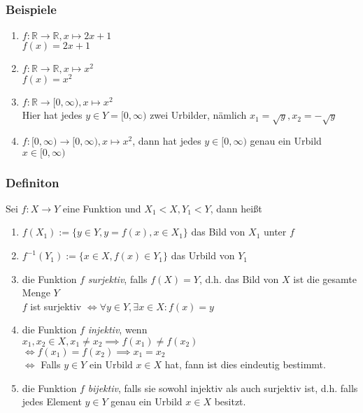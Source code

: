 \documentclass{article}
\begin{document}
    \subsubsection{Beispiele}
      \begin{enumerate}[label=(\roman*)]
        \item $f: \mathbb{R} \to \mathbb{R}, x \mapsto 2x+1$ \\
          $f(x)=2x+1$
        \item $f: \mathbb{R} \to \mathbb{R}, x \mapsto x^2$ \\
          $f(x)=x^2$
        \item $f: \mathbb{R} \to [0,\infty), x \mapsto x^2$ \\
          Hier hat jedes $y \in Y=[0,\infty)$ zwei Urbilder, nämlich
          $x_1 = \sqrt{y}, x_2 = -\sqrt{y}$
        \item $f: [0,\infty) \to [0,\infty), x \mapsto x^2$, dann hat jedes
          $y \in [0,\infty)$ genau ein Urbild $x \in [0,\infty)$
      \end{enumerate}

    \subsubsection{Definiton}
      Sei $f: X \to Y$ eine Funktion und $X_1 < X, Y_1 < Y$, dann heißt
      \begin{enumerate}[label=(\roman*)]
        \item $f(X_1) := \{ y \in Y, y=f(x),x \in X_1\}$ das Bild von $X_1$ unter $f$
        \item $f^{-1}(Y_1) := \{ x \in X, f(x) \in Y_1 \}$ das Urbild von $Y_1$
        \item die Funktion $f$ \emph{surjektiv}, falls $f(X) = Y$, d.h. das Bild
          von $X$ ist die gesamte Menge $Y$ \\
          $f$ ist surjektiv $\iff \forall y \in Y, \exists x \in X: f(x)=y$
        \item die Funktion $f$ \emph{injektiv}, wenn \\
          $x_1, x_2 \in X, x_1 \neq x_2 \implies f(x_1) \neq f(x_2)$ \\
          $\iff f(x_1) = f(x_2) \implies x_1 = x_2$ \\
          $\iff$ Falls $y \in Y$ ein Urbild $x \in X$ hat, fann ist dies eindeutig
          bestimmt.
        \item die Funktion $f$ \emph{bijektiv}, falls sie sowohl injektiv als
          auch surjektiv ist, d.h. falls jedes Element $y \in Y$ genau ein Urbild
          $x \in X$ besitzt.
      \end{enumerate}
\end{document}
